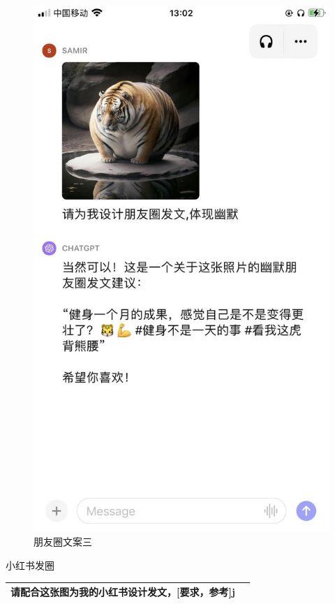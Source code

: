 \documentclass[12pt]{book}
\begin{document}
   \begin{figure}[htbp]	
	\centering
	\includegraphics[width=1.0\textwidth]{image/3.png}
	\caption{朋友圈文案三}
	\label{fig:myImage}
\end{figure} 


\bigskip
小红书发圈

\begin{tabular}{|p{15cm}|p{3cm}|}
	\hline
请配合这张图为我的小红书设计发文，[要求，参考]j\\
	\hline
\end{tabular}\\
\end{document}
